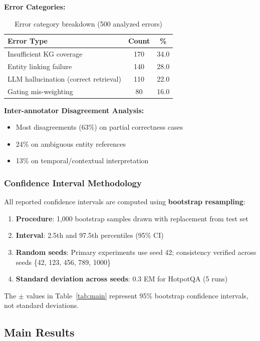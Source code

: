 \documentclass[10pt,twocolumn]{article}
\begin{document}
\textbf{Error Categories:}
\begin{table}[h]
\centering
\caption{Error category breakdown (500 analyzed errors)}
\label{tab:error_categories}
\small
\begin{tabular}{@{}lcc@{}}
\toprule
\textbf{Error Type} & \textbf{Count} & \textbf{\%} \\
\midrule
Insufficient KG coverage & 170 & 34.0 \\
Entity linking failure & 140 & 28.0 \\
LLM hallucination (correct retrieval) & 110 & 22.0 \\
Gating mis-weighting & 80 & 16.0 \\
\bottomrule
\end{tabular}
\end{table}

\textbf{Inter-annotator Disagreement Analysis:}
\begin{itemize}
    \item Most disagreements (63\%) on partial correctness cases
    \item 24\% on ambiguous entity references
    \item 13\% on temporal/contextual interpretation
\end{itemize}

\subsubsection{Confidence Interval Methodology}
\label{sec:confidence_intervals}

All reported confidence intervals are computed using \textbf{bootstrap resampling}:

\begin{enumerate}
    \item \textbf{Procedure}: 1,000 bootstrap samples drawn with replacement from test set
    \item \textbf{Interval}: 2.5th and 97.5th percentiles (95\% CI)
    \item \textbf{Random seeds}: Primary experiments use seed 42; consistency verified across seeds \{42, 123, 456, 789, 1000\}
    \item \textbf{Standard deviation across seeds}: 0.3 EM for HotpotQA (5 runs)
\end{enumerate}

The $\pm$ values in Table~\ref{tab:main} represent 95\% bootstrap confidence intervals, not standard deviations.


\subsection{Main Results}
\end{document}
